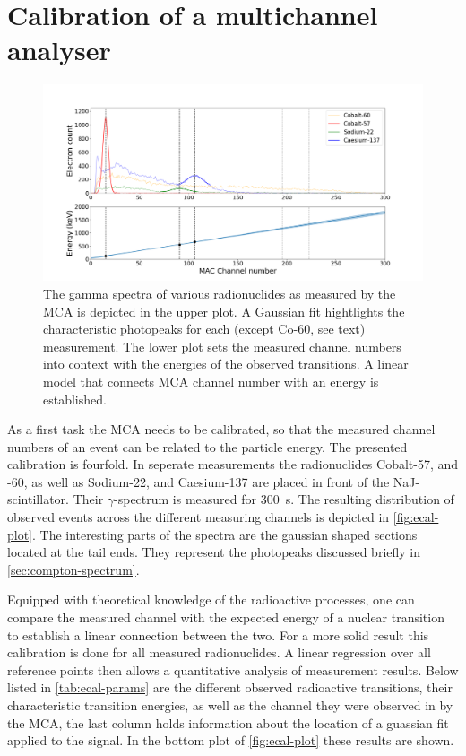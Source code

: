 
\section{Calibration of a multichannel analyser}
\label{sec:ecal}

\begin{figure}
	\includegraphics[width=1.0\textwidth]{./fig/ecal-plot.png}
	\caption{The gamma spectra of various radionuclides as measured by the MCA
	is depicted in the upper plot. A Gaussian fit hightlights the characteristic
	photopeaks for each (except Co-60, see text) measurement. The lower plot
	sets the measured channel numbers into context with the energies of the
	observed transitions. A linear model that connects MCA channel number with an
	energy is established.}
	\label{fig:ecal-plot}
\end{figure}

As a first task the MCA needs to be calibrated, so that the measured channel numbers of an
event can be related to the particle energy. The presented
calibration is fourfold. In seperate measurements the radionuclides Cobalt-57, and
-60, as well as Sodium-22, and Caesium-137 are placed in front of the
NaJ-scintillator. Their $\gamma$-spectrum is measured for \SI{300}{\second}. The
resulting distribution of observed events across the different measuring channels is
depicted in \autoref{fig:ecal-plot}. The interesting parts of the spectra are the
gaussian shaped sections located at the tail ends. They represent the photopeaks
discussed briefly in \autoref{sec:compton-spectrum}.

Equipped with theoretical knowledge of the radioactive processes, one can compare the
measured channel with the expected energy of a nuclear transition to establish a
linear connection between the two. For a more solid result this calibration is done
for all measured radionuclides. A linear regression over all reference
points then allows a quantitative analysis of measurement results. Below listed in
\autoref{tab:ecal-params} are the different observed radioactive transitions, their
characteristic transition energies, as well as the channel they were observed in by
the MCA, the last column holds information about the location of a guassian fit
applied to the signal. In the bottom plot of \autoref{fig:ecal-plot} these results
are shown.

